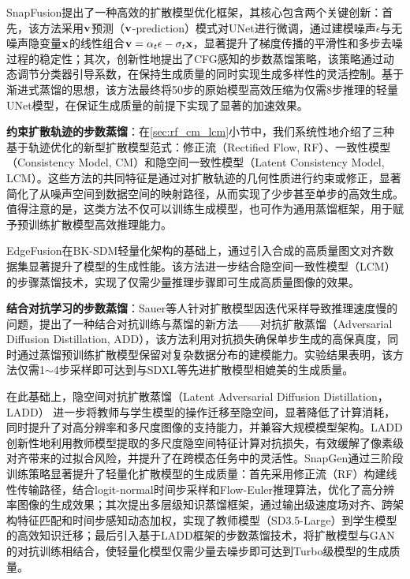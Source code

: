 \documentclass[11pt,a4paper,UTF8]{ctexart}
\begin{document}
SnapFusion\cite{li2023snapfusion}提出了一种高效的扩散模型优化框架，其核心包含两个关键创新：首先，该方法采用$\mathbf{v}$预测（$\mathbf{v}$-prediction）模式对UNet进行微调，通过建模噪声$\epsilon$与无噪声隐变量$\mathbf{x}$的线性组合$\mathbf{v}=\alpha_t\epsilon-\sigma_t\mathbf{x}$，显著提升了梯度传播的平滑性和多步去噪过程的稳定性；其次，创新性地提出了CFG感知的步数蒸馏策略，该策略通过动态调节分类器引导系数，在保持生成质量的同时实现生成多样性的灵活控制。基于渐进式蒸馏的思想，该方法最终将50步的原始模型高效压缩为仅需8步推理的轻量UNet模型，在保证生成质量的前提下实现了显著的加速效果。

\textbf{约束扩散轨迹的步数蒸馏}：在\ref{sec:rf_cm_lcm}小节中，我们系统性地介绍了三种基于轨迹优化的新型扩散模型范式：修正流（Rectified Flow, RF）\cite{liu2022flow}、一致性模型（Consistency Model, CM）\cite{pmlr-v202-song23a}和隐空间一致性模型（Latent Consistency Model, LCM）\cite{luo2023latent}。这些方法的共同特征是通过对扩散轨迹的几何性质进行约束或修正，显著简化了从噪声空间到数据空间的映射路径，从而实现了少步甚至单步的高效生成。值得注意的是，这类方法不仅可以训练生成模型，也可作为通用蒸馏框架，用于赋予预训练扩散模型高效推理能力。

EdgeFusion\cite{castells2024edgefusion}在BK-SDM轻量化架构的基础上，通过引入合成的高质量图文对齐数据集显著提升了模型的生成性能。该方法进一步结合隐空间一致性模型（LCM）的步骤蒸馏技术，实现了仅需少量推理步骤即可生成高质量图像的效果。

\textbf{结合对抗学习的步数蒸馏}：Sauer等人\cite{sauer2024adversarial}针对扩散模型因迭代采样导致推理速度慢的问题，提出了一种结合对抗训练与蒸馏的新方法——对抗扩散蒸馏（Adversarial Diffusion Distillation, ADD），该方法利用对抗损失确保单步生成的高保真度，同时通过蒸馏预训练扩散模型保留对复杂数据分布的建模能力。实验结果表明，该方法仅需1$\sim$4步采样即可达到与SDXL\cite{podell2023sdxl}等先进扩散模型相媲美的生成质量。

在此基础上，隐空间对抗扩散蒸馏（Latent Adversarial Diffusion Distillation，LADD）\cite{sauer2024fast} 进一步将教师与学生模型的操作迁移至隐空间，显著降低了计算消耗，同时提升了对高分辨率和多尺度图像的支持能力，并兼容大规模模型架构。LADD创新性地利用教师模型提取的多尺度隐空间特征计算对抗损失，有效缓解了像素级对齐带来的过拟合风险，并提升了在跨模态任务中的灵活性。SnapGen\cite{hu2024snapgen}通过三阶段训练策略显著提升了轻量化扩散模型的生成质量：首先采用修正流（RF）\cite{liu2022flow}构建线性传输路径，结合logit-normal时间步采样和Flow-Euler推理算法，优化了高分辨率图像的生成效果；其次提出多层级知识蒸馏框架，通过输出级速度场对齐、跨架构特征匹配和时间步感知动态加权，实现了教师模型（SD3.5-Large）到学生模型的高效知识迁移；最后引入基于LADD框架\cite{sauer2024fast}的步数蒸馏技术，将扩散模型与GAN的对抗训练相结合，使轻量化模型仅需少量去噪步即可达到Turbo级模型的生成质量。
\end{document}
